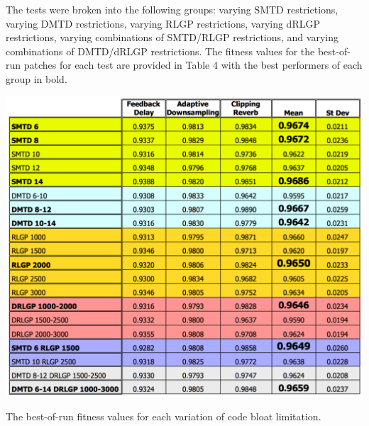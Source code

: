 \documentclass[12pt]{report} 	%
\numberwithin{figure}{chapter}
\numberwithin{table}{chapter}
\numberwithin{equation}{chapter}
\begin{document}
\begin{flushleft}
The tests were broken into the following groups: varying SMTD restrictions, varying DMTD restrictions, varying RLGP restrictions, varying dRLGP restrictions, varying combinations of SMTD/RLGP restrictions, and varying combinations of DMTD/dRLGP restrictions. The fitness values for the best-of-run patches for each test are provided in Table 4 with the best performers of each group in bold.
\begin{table}[h!]
\begin{center}
\includegraphics[scale=0.6,width=\linewidth]{ResourceLimTable1}
\caption[Code bloat limitation best-of-run values]{The best-of-run fitness values for each variation of code bloat limitation.}
\end{center}
\end{table}


\end{flushleft}
\end{document}
